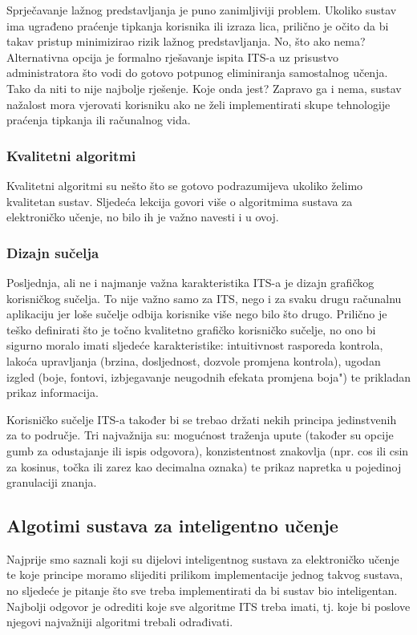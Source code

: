 \documentclass[times, utf8, zavrsni]{fer}
\begin{document}
\par
Sprječavanje lažnog predstavljanja je puno zanimljiviji problem. Ukoliko sustav ima ugrađeno praćenje tipkanja korisnika ili izraza lica, prilično je očito da bi takav pristup minimizirao rizik lažnog predstavljanja. No, što ako nema? Alternativna opcija je formalno rješavanje ispita ITS-a uz prisustvo administratora što vodi do gotovo potpunog eliminiranja samostalnog učenja. Tako da niti to nije najbolje rješenje. Koje onda jest? Zapravo ga i nema, sustav nažalost mora vjerovati korisniku ako ne želi implementirati skupe tehnologije praćenja tipkanja ili računalnog vida.

\subsubsection{Kvalitetni algoritmi}
Kvalitetni algoritmi su nešto što se gotovo podrazumijeva ukoliko želimo kvalitetan sustav. Sljedeća lekcija govori više o algoritmima sustava za elektroničko učenje, no bilo ih je važno navesti i u ovoj.

\subsubsection{Dizajn sučelja}
Posljednja, ali ne i najmanje važna karakteristika ITS-a je dizajn grafičkog korisničkog sučelja. To nije važno samo za ITS, nego i za svaku drugu računalnu aplikaciju jer loše sučelje odbija korisnike više nego bilo što drugo. Prilično je teško definirati što je točno kvalitetno grafičko korisničko sučelje, no ono bi sigurno moralo imati sljedeće karakteristike: intuitivnost rasporeda kontrola, lakoća upravljanja (brzina, dosljednost, dozvole promjena kontrola), ugodan izgled (boje, fontovi, izbjegavanje neugodnih efekata promjena boja") te prikladan prikaz informacija.
\par
Korisničko sučelje ITS-a također bi se trebao držati nekih principa jedinstvenih za to područje. Tri najvažnija su: mogućnost traženja upute (također su opcije gumb za odustajanje ili ispis odgovora), konzistentnost znakovlja (npr. cos ili csin za kosinus, točka ili zarez kao decimalna oznaka) te prikaz napretka u pojedinoj granulaciji znanja.

\subsection{Algotimi sustava za inteligentno učenje}

Najprije smo saznali koji su dijelovi inteligentnog sustava za elektroničko učenje te koje principe moramo slijediti prilikom implementacije jednog takvog sustava, no sljedeće je pitanje što sve treba implementirati da bi sustav bio inteligentan. Najbolji odgovor je odrediti koje sve algoritme ITS treba imati, tj. koje bi poslove njegovi najvažniji algoritmi trebali odrađivati.
\end{document}
